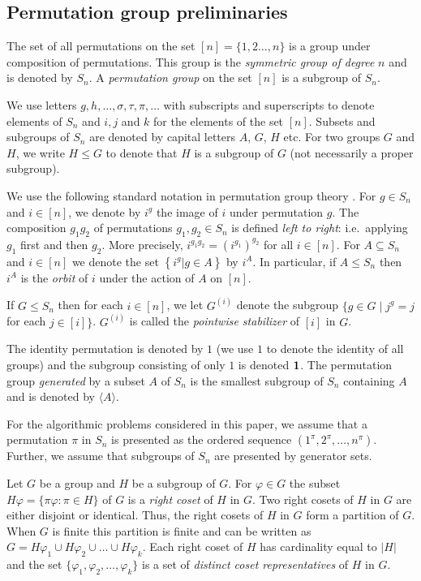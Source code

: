 \documentclass{elsart}
\renewcommand{\angle}[1]{\langle #1\rangle}
\begin{document}
\subsection{Permutation group preliminaries}

The set of all permutations on the set $[n]=\{1,2\ldots,n\}$ is a
group under composition of permutations. This group is the
\emph{symmetric group of degree} $n$ and is denoted by $S_n$.  A {\em
  permutation group} on the set $[n]$ is a subgroup of $S_n$.

We use letters $g,h,\ldots,\sigma,\tau ,\pi,\dots$ with subscripts and
superscripts to denote elements of $S_n$ and $i,j$ and $k$ for the
elements of the set $[n]$.  Subsets and subgroups of $S_n$ are denoted
by capital letters $A$, $G$, $H$ etc. For two groups $G$ and $H$, we
write $H\leq G$ to denote that $H$ is a subgroup of $G$ (not
necessarily a proper subgroup).

We use the following standard notation in permutation group theory
\cite{wielandt64finite,luks93permutation}. For $g\in S_n$ and
$i\in[n]$, we denote by $i^g$ the image of $i$ under permutation $g$.
The composition $g_1g_2$ of permutations $g_1, g_2\in S_n$ is defined
{\em left to right}: i.e.\ applying $g_1$ first and then $g_2$. More
precisely, $i^{g_1g_2}=(i^{g_1})^{g_2}$ for all $i\in[n]$. For $A
\subseteq S_n$ and $i \in [n]$ we denote the set $\left\{ i^g | g \in
  A \right\}$ by $i^A$. In particular, if $A\leq S_n$ then $i^A$ is
the \emph{orbit} of $i$ under the action of $A$ on $[n]$.

If $G\leq S_n$ then for each $i\in[n]$, we let $G^{(i)}$ denote the
subgroup $\{g\in G\mid j^g=j$ for each $j\in[i]\}$. $G^{(i)}$ is
called the {\em pointwise stabilizer} of $[i]$ in $G$.

The identity permutation is denoted by $1$ (we use $1$ to denote the
identity of all groups) and the subgroup consisting of only $1$ is
denoted ${\bf 1}$. The permutation group {\em generated} by a subset
$A$ of $S_n$ is the smallest subgroup of $S_n$ containing $A$ and is
denoted by $\angle{A}$. 

For the algorithmic problems considered in this paper, we assume that
a permutation $\pi$ in $S_n$ is presented as the ordered sequence
$(1^\pi,2^\pi,\ldots,n^\pi)$. Further, we assume that subgroups
of $S_n$ are presented by generator sets. 

Let $G$ be a group and $H$ be a subgroup of $G$. For $\varphi\in G$
the subset $H\varphi=\{\pi\varphi:\pi\in H\}$ of $G$ is a {\em right
  coset} of $H$ in $G$. Two right cosets of $H$ in $G$ are either
disjoint or identical. Thus, the right cosets of $H$ in $G$ form a
partition of $G$. When $G$ is finite this partition is finite and can
be written as $G=H\varphi_1\cup H\varphi_2 \cup\dots \cup H\varphi_k$.
Each right coset of $H$ has cardinality equal to $|H|$ and the set
$\{\varphi_1,\varphi_2,\dots,\varphi_k\}$ is a set of \emph{distinct
  coset representatives} of $H$ in $G$.
\end{document}
